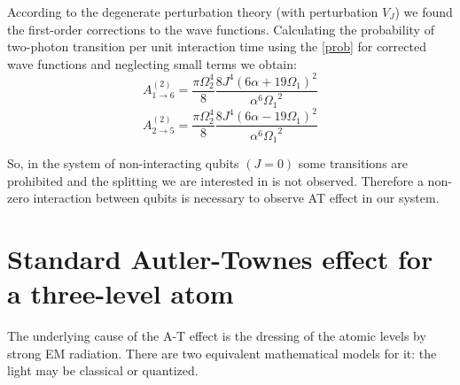 \documentclass[%
 aip,
 amsmath,amssymb,
 reprint,%
]{revtex4-1}
\begin{document}
According to the degenerate perturbation theory (with perturbation $V_J$) we found the first-order corrections to the wave functions. Calculating the probability of two-photon transition per unit interaction time using the \autoref{prob} for corrected  wave functions and neglecting small terms we obtain:
\begin{equation}
	A^{(2)}_{1\rightarrow 6} =\frac{\pi\Omega_2^4}{8} \frac{8 J^4 (6 \text{$\alpha $}+19 \text{$\Omega_1 $})^2}{\text{$\alpha
			$}^6 \text{$\Omega_1$}^2}
\end{equation}
\begin{equation}
A^{(2)}_{2\rightarrow 5} =\frac{\pi\Omega_2^4}{8} \frac{8 J^4 (6 \text{$\alpha $}-19 \text{$\Omega_1 $})^2}{\text{$\alpha
		$}^6 \text{$\Omega_1$}^2}
\end{equation}

So, in the system of non-interacting qubits $(J=0)$ some transitions are prohibited and the splitting we are interested in is not observed. Therefore a non-zero interaction between qubits is necessary to observe AT effect in our system.



\appendix

\section{Standard Autler-Townes effect for a three-level atom} \label{sec:3-level-at}

The underlying cause of the A-T effect is the dressing of the atomic levels by strong EM radiation. There are two equivalent mathematical models for it: the light may be classical or quantized.
\end{document}
